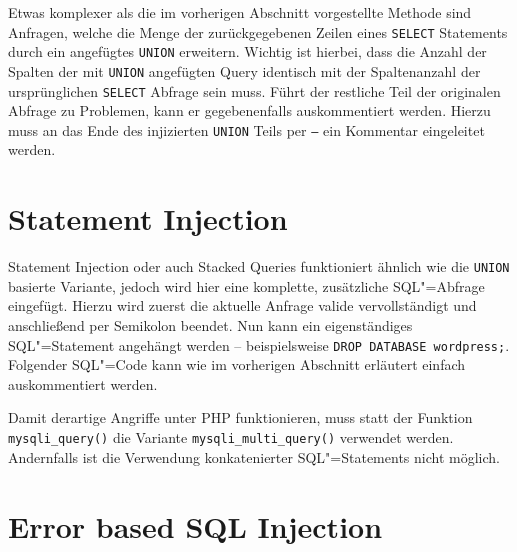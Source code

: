Etwas komplexer als die im vorherigen Abschnitt vorgestellte Methode sind Anfragen, welche die Menge der zurückgegebenen Zeilen eines \texttt{SELECT} Statements durch ein angefügtes \texttt{UNION} erweitern. Wichtig ist hierbei, dass die Anzahl der Spalten der mit \texttt{UNION} angefügten Query identisch mit der Spaltenanzahl der ursprünglichen  \texttt{SELECT} Abfrage sein muss. Führt der restliche Teil der originalen Abfrage zu Problemen, kann er gegebenenfalls auskommentiert werden. Hierzu muss an das Ende des injizierten \texttt{UNION} Teils per \texttt{--} ein Kommentar eingeleitet werden.


\section{Statement Injection}

{Statement Injection } oder auch Stacked Queries funktioniert ähnlich wie die \texttt{UNION} basierte Variante, jedoch wird hier eine komplette, zusätzliche SQL"=Abfrage eingefügt. Hierzu wird zuerst die aktuelle Anfrage valide vervollständigt und anschließend per Semikolon beendet. Nun kann ein eigenständiges SQL"=Statement angehängt werden -- beispielsweise \texttt{DROP DATABASE wordpress;}. Folgender SQL"=Code kann wie im vorherigen Abschnitt erläutert einfach auskommentiert werden.


Damit derartige Angriffe unter PHP funktionieren, muss statt der Funktion \texttt{mysqli_query()} die Variante \texttt{mysqli_multi_query()} verwendet werden. Andernfalls ist die Verwendung konkatenierter SQL"=Statements nicht möglich.


\section{Error based SQL Injection}

